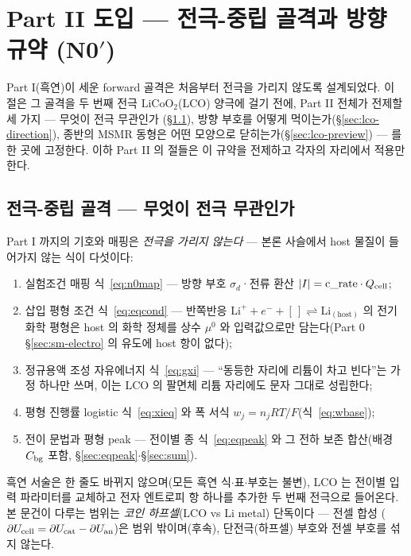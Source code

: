 \section{Part II 도입 --- 전극-중립 골격과 방향 규약 (N0$'$)}\label{sec:lco-intro}
Part I(흑연)이 세운 forward 골격은 처음부터 전극을 가리지 않도록 설계되었다. 이 절은 그 골격을 두 번째 전극
$\mathrm{LiCoO_2}$(LCO) 양극에 걸기 전에, Part II 전체가 전제할 세 가지 --- 무엇이 전극 무관인가
(\S\ref{sec:lco-map}), 방향 부호를 어떻게 먹이는가(\S\ref{sec:lco-direction}), 종반의 MSMR 동형은 어떤
모양으로 닫히는가(\S\ref{sec:lco-preview}) --- 를 한 곳에 고정한다. 이하 Part II 의 절들은 이 규약을
전제하고 각자의 자리에서 적용만 한다.

\subsection{전극-중립 골격 --- 무엇이 전극 무관인가}\label{sec:lco-map}
Part I 까지의 기호와 매핑은 \emph{전극을 가리지 않는다} --- 본론 사슬에서 host 물질이 들어가지 않는 식이
다섯이다:
\begin{enumerate}[label=(\arabic*),leftmargin=2.2em,itemsep=1pt]
\item 실험조건 매핑 식~\eqref{eq:n0map} --- 방향 부호 $\sigma_d$·전류 환산 $|I|=\text{c\_rate}\cdot Q_{\mathrm{cell}}$;
\item 삽입 평형 조건 식~\eqref{eq:eqcond} --- 반쪽반응
$\mathrm{Li}^++e^-+[\,]\rightleftharpoons\mathrm{Li}_{(\mathrm{host})}$ 의 전기화학 평형은 host 의 화학
정체를 상수 $\mu^0$ 와 입력값으로만 담는다(Part 0 \S\ref{sec:sm-electro} 의 유도에 host 항이 없다);
\item 정규용액 조성 자유에너지 식~\eqref{eq:gxi} --- ``동등한 자리에 리튬이 차고 빈다''는 가정 하나만 쓰며,
이는 LCO 의 팔면체 리튬 자리에도 문자 그대로 성립한다;
\item 평형 진행률 logistic 식~\eqref{eq:xieq} 와 폭 서식 $w_j=n_jRT/F$(식~\eqref{eq:wbase});
\item 전이 문법과 평형 peak --- 전이별 종 식~\eqref{eq:eqpeak} 와 그 전하 보존 합산(배경 $C_{\mathrm{bg}}$ 포함,
\S\ref{sec:eqpeak}$\cdot$\S\ref{sec:sum}).
\end{enumerate}
흑연 서술은 한 줄도 바뀌지 않으며(모든 흑연
식$\cdot$표$\cdot$부호는 불변), LCO 는 전이별 입력 파라미터를 교체하고 전자 엔트로피 항 하나를 추가한
두 번째 전극으로 들어온다. 본 문건이 다루는 범위는 \emph{코인 하프셀}(LCO vs Li metal) 단독이다 --- 전셀 합성
($\partial U_{\mathrm{cell}}=\partial U_\mathrm{cat}-\partial U_\mathrm{an}$)은 범위 밖이며(후속), 단전극(하프셀) 부호와 전셀
부호를 섞지 않는다.

